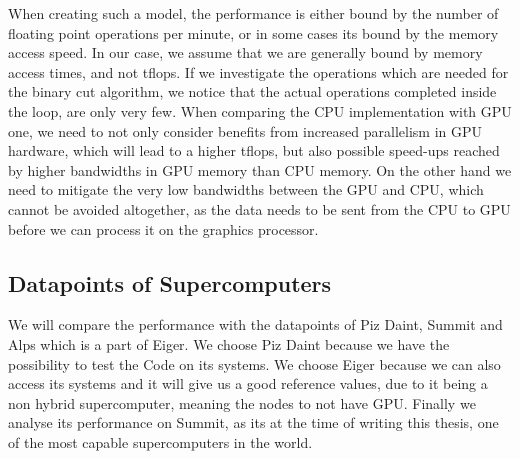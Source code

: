 \documentclass[]{article}
\begin{document}
When creating such a model, the performance is either bound by the number of floating point operations per minute, or in some cases its bound by the memory access speed. In our case, we assume that we are generally bound by memory access times, and not tflops. If we investigate the operations which are needed for the binary cut algorithm, we notice that the actual operations completed inside the loop, are only very few. When comparing the CPU implementation with GPU one, we need to not only consider benefits from increased parallelism in GPU hardware, which will lead to a higher tflops, but also possible speed-ups reached by higher bandwidths in GPU memory than CPU memory. On the other hand we need to mitigate the very low bandwidths between the GPU and CPU, which cannot be avoided altogether, as the data needs to be sent from the CPU to GPU before we can process it on the graphics processor.


\subsection{Datapoints of Supercomputers}

We will compare the performance with the datapoints of Piz Daint, Summit and Alps which is a part of Eiger. We choose Piz Daint because we have the possibility to test the Code on its systems. We choose Eiger because we can also access its systems and it will give us a good reference values, due to it being a non hybrid supercomputer, meaning the nodes to not have GPU. Finally we analyse its performance on Summit, as its at the time of writing this thesis, one of the most capable supercomputers in the world.
\end{document}
